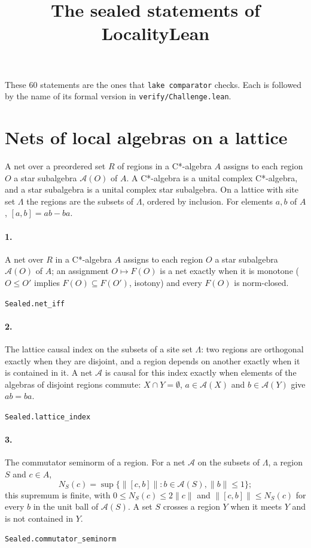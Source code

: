 \documentclass[11pt]{article}
\title{The sealed statements of LocalityLean}\date{}
\begin{document}
\maketitle
These 60 statements are the ones that \texttt{lake comparator} checks. Each is followed by the name of its formal version in \texttt{verify/Challenge.lean}.

\section*{Nets of local algebras on a lattice}
A net over a preordered set $R$ of regions in a C*-algebra $A$ assigns to each region $O$ a star subalgebra $\mathcal A(O)$ of $A$. A C*-algebra is a unital complex C*-algebra, and a star subalgebra is a unital complex star subalgebra. On a lattice with site set $\Lambda$ the regions are the subsets of $\Lambda$, ordered by inclusion. For elements $a, b$ of $A$, $[a, b] = ab - ba$.

\paragraph{1.} A net over $R$ in a C*-algebra $A$ assigns to each region $O$ a star subalgebra $\mathcal A(O)$ of $A$; an assignment $O \mapsto F(O)$ is a net exactly when it is monotone ($O \le O'$ implies $F(O) \subseteq F(O')$, isotony) and every $F(O)$ is norm-closed.\par{\footnotesize\texttt{Sealed.net\_iff}}

\paragraph{2.} The lattice causal index on the subsets of a site set $\Lambda$: two regions are orthogonal exactly when they are disjoint, and a region depends on another exactly when it is contained in it. A net $\mathcal A$ is causal for this index exactly when elements of the algebras of disjoint regions commute: $X \cap Y = \emptyset$, $a \in \mathcal A(X)$ and $b \in \mathcal A(Y)$ give $ab = ba$.\par{\footnotesize\texttt{Sealed.lattice\_index}}

\paragraph{3.} The commutator seminorm of a region. For a net $\mathcal A$ on the subsets of $\Lambda$, a region $S$ and $c \in A$, \[N_S(c) = \sup \{\|[c, b]\| : b \in \mathcal A(S), \|b\| \le 1\};\] this supremum is finite, with $0 \le N_S(c) \le 2\|c\|$ and $\|[c, b]\| \le N_S(c)$ for every $b$ in the unit ball of $\mathcal A(S)$. A set $S$ crosses a region $Y$ when it meets $Y$ and is not contained in $Y$.\par{\footnotesize\texttt{Sealed.commutator\_seminorm}}
\end{document}
